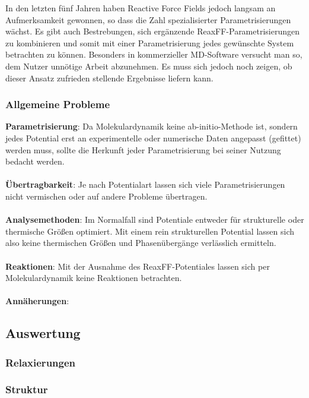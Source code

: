 In den letzten fünf Jahren haben Reactive Force Fields jedoch langsam an Aufmerksamkeit gewonnen, so dass die Zahl spezialisierter Parametrisierungen wächst.
Es gibt auch Bestrebungen, sich ergänzende ReaxFF-Parametrisierungen zu kombinieren und somit mit einer Parametrisierung jedes gewünschte System betrachten zu können.
Besonders in kommerzieller MD-Software versucht man so, dem Nutzer unnötige Arbeit abzunehmen.
Es muss sich jedoch noch zeigen, ob dieser Ansatz zufrieden stellende Ergebnisse liefern kann.

\subsubsection{Allgemeine Probleme}

\textbf{Parametrisierung}:
Da Molekulardynamik keine ab-initio-Methode ist, sondern jedes Potential erst an experimentelle oder numerische Daten angepasst (gefittet) werden muss, sollte die Herkunft jeder Parametrisierung bei seiner Nutzung bedacht werden.
\\\\
\textbf{Übertragbarkeit}:
Je nach Potentialart lassen sich viele Parametrisierungen nicht vermischen oder auf andere Probleme übertragen.
\\\\
\textbf{Analysemethoden}:
Im Normalfall sind Potentiale entweder für strukturelle oder thermische Größen optimiert.
Mit einem rein strukturellen Potential lassen sich also keine thermischen Größen und Phasenübergänge verlässlich ermitteln.
\\\\
\textbf{Reaktionen}:
Mit der Ausnahme des ReaxFF-Potentiales lassen sich per Molekulardynamik keine Reaktionen betrachten.
\\\\
\textbf{Annäherungen}:

\subsection{Auswertung}

\subsubsection{Relaxierungen}

\subsubsection{Struktur}


